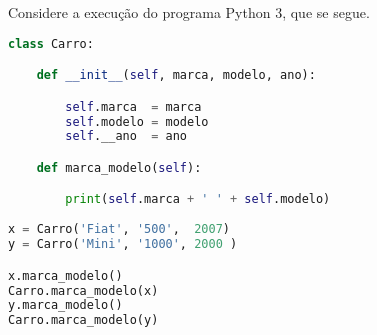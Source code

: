\documentclass[12pt,varwidth=16cm,border=17pt]{standalone}
\begin{document}
Considere a execução do programa Python 3, que se segue. 

\begin{lstlisting}[language=Python]
class Carro:

    def __init__(self, marca, modelo, ano):

        self.marca  = marca
        self.modelo = modelo
        self.__ano  = ano

    def marca_modelo(self):

        print(self.marca + ' ' + self.modelo)
             
x = Carro('Fiat', '500',  2007)
y = Carro('Mini', '1000', 2000 )

x.marca_modelo()
Carro.marca_modelo(x) 
y.marca_modelo()
Carro.marca_modelo(y) 
\end{lstlisting}
\end{document}
